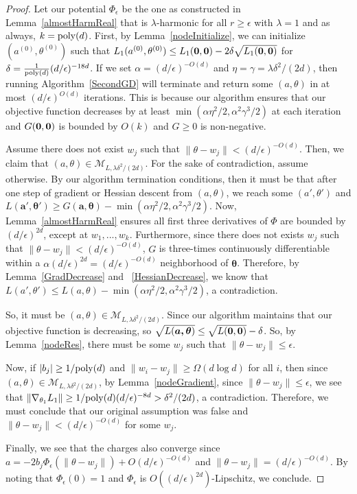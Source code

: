 \begin{proof}
Let our potential $\Phi_{\epsilon}$ be the one as constructed in Lemma~\ref{almostHarmReal} that is $\lambda$-harmonic for all $r \geq \epsilon$ with $\lambda = 1$ and as always, $k = \mathrm{poly}(d)$. First, by Lemma~\ref{nodeInitialize},  we can initialize ${(a^{(0)},\theta^{(0)})}$ such that $L_1({a^{(0)},\theta^{(0)}}) \leq  L_1({\bf 0,0}) - 2\delta \sqrt{L_1({\bf 0,0})}$ for $ \delta = \frac{1}{\mathrm{poly}(d)}(d/\epsilon)^{ -18d}$. If we set $\alpha = (d/\epsilon)^{-O(d)}$ and $\eta = \gamma = \lambda \delta^2/(2d)$,  then running Algorithm~\ref{SecondGD} will terminate and return some $(a,\theta)$ in at most $(d/\epsilon)^{O(d)}$ iterations. This is because our algorithm ensures that our objective function decreases by at least $\min(\alpha \eta^2/2, \alpha^2\gamma^3/2)$ at each iteration and $G({\bf 0, 0})$ is bounded by $O(k)$ and $G \geq 0$ is non-negative.

Assume there does not exist $w_j$ such that $\|\theta - w_j\| < (d/\epsilon)^{-O(d)}$. Then, we claim that $(a,\theta) \in \mathcal{M}_{L,\lambda \delta^2/(2d)}$. For the sake of contradiction, assume otherwise. By our algorithm termination conditions, then it must be that after one step of gradient or Hessian descent from $(a,\theta)$, we reach some $(a',\theta')$ and $L(\boldsymbol{a',\theta'}) \geq G(\boldsymbol{a,\theta}) - \min(\alpha\eta^2/2,\alpha^2\gamma^3/2)$. Now, Lemma~\ref{almostHarmReal} ensures all first three derivatives of $\Phi$ are bounded by $(d/\epsilon)^{2d}$, except at $w_1,...,w_k$. Furthermore, since there does not exists $w_j$ such that $\|\theta - w_j\| < (d/\epsilon)^{-O(d)}$, $G$ is three-times continuously differentiable within a $\alpha (d/\epsilon)^{2d} = (d/\epsilon)^{-O(d)}$ neighborhood of $\boldsymbol{\theta}$. Therefore, by Lemma~\ref{GradDecrease} and ~\ref{HessianDecrease}, we know that $L(a',\theta') \leq L(a,\theta) - \min(\alpha\eta^2/2,\alpha^2\gamma^3/2)$, a contradiction. 

So, it must be $(a,\theta) \in \mathcal{M}_{L,\lambda \delta^2/(2d)}$. Since our algorithm maintains that our objective function is decreasing, so $\sqrt{L(\boldsymbol{a,\theta})} \leq \sqrt{L({\bf 0,0})} - \delta $. So, by Lemma~\ref{nodeRes}, there must be some $w_j$ such that $\|\theta- w_j\|\leq \epsilon$.

Now, if $|b_j| \geq 1/\mathrm{poly}(d)$ and $\|w_i - w_j\| \geq \Omega(d\log d)$ for all $i$, then since $(a,\theta) \in \mathcal{M}_{L,\lambda \delta^2/(2d)}$, by Lemma~\ref{nodeGradient}, since $\|\theta - w_j \| \leq \epsilon$, we see that $\|\nabla_{\theta_1}L_1 \| \geq 1/\mathrm{poly}(d)(d/\epsilon)^{-8d} > \delta^2/(2d)$, a contradiction. Therefore, we must conclude that our original assumption was false and $\|\theta - w_j\| < (d/\epsilon)^{-O(d)}$ for some $w_j$.

Finally, we see that the charges also converge since $a = -2b_j \Phi_\epsilon(\|\theta - w_j\|) + O(d/\epsilon)^{-O(d)}$ and $\|\theta - w_j\| = (d/\epsilon)^{-O(d)}$. By noting that $\Phi_\epsilon(0) = 1$ and $\Phi_\epsilon$ is $O((d/\epsilon)^{2d})$-Lipschitz, we conclude. 
\end{proof}

